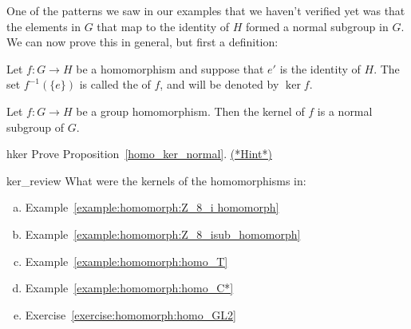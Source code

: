 \medskip

One of the patterns we saw in our examples that we haven't verified yet was that the elements in $G$ that map to the identity of $H$ formed a normal subgroup in $G$.  We can now prove this in general, but first a definition:
 
\begin{defn}\label{def:kernel} 
Let $f : G \rightarrow H$ be a  homomorphism and suppose that
$e'$ is the identity of $H$. 
The set  $f^{-1} ( \{ e \})$ is  called the  of $f$, and will
be denoted by $\ker f$\label{kernelofphi}. 
\end{defn}
 
 
\begin{thmprop}\label{homo_ker_normal}
Let $f : G \rightarrow H$ be a group homomorphism. Then the kernel
of $f$ is a normal subgroup of $G$. 
\end{thmprop}

\begin{exercise}{hker}
Prove Proposition~\ref{homo_ker_normal}. 
\hyperref[sec:homomorph:hints]{(*Hint*)} 
\end{exercise}

\begin{exercise}{ker_review}
What were the kernels of the homomorphisms in:
\begin{enumerate}[(a)]
\item
Example~\ref{example:homomorph:Z_8_i homomorph}
\item
Example~\ref{example:homomorph:Z_8_isub_homomorph}
\item
Example~\ref{example:homomorph:homo_T}
\item
Example~\ref{example:homomorph:homo_C*}
\item
Exercise~\ref{exercise:homomorph:homo_GL2}
\end{enumerate}
\end{exercise} 
 
 

